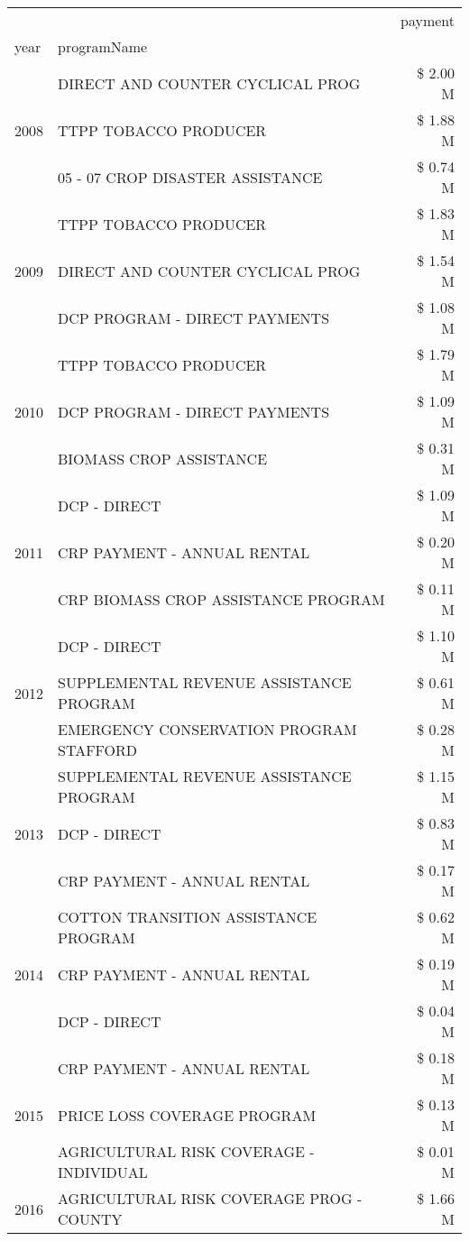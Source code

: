 \begin{tabular}{llr}
\toprule
 &  & payment \\
year & programName &  \\
\midrule
\multirow[t]{3}{*}{2008} & DIRECT AND COUNTER CYCLICAL PROG & \$ 2.00 M \\
 & TTPP TOBACCO PRODUCER & \$ 1.88 M \\
 & 05 - 07 CROP DISASTER ASSISTANCE & \$ 0.74 M \\
\cline{1-3}
\multirow[t]{3}{*}{2009} & TTPP TOBACCO PRODUCER & \$ 1.83 M \\
 & DIRECT AND COUNTER CYCLICAL PROG & \$ 1.54 M \\
 & DCP PROGRAM - DIRECT PAYMENTS & \$ 1.08 M \\
\cline{1-3}
\multirow[t]{3}{*}{2010} & TTPP TOBACCO PRODUCER & \$ 1.79 M \\
 & DCP PROGRAM - DIRECT PAYMENTS & \$ 1.09 M \\
 & BIOMASS CROP ASSISTANCE & \$ 0.31 M \\
\cline{1-3}
\multirow[t]{3}{*}{2011} & DCP - DIRECT & \$ 1.09 M \\
 & CRP PAYMENT - ANNUAL RENTAL & \$ 0.20 M \\
 & CRP BIOMASS CROP ASSISTANCE PROGRAM & \$ 0.11 M \\
\cline{1-3}
\multirow[t]{3}{*}{2012} & DCP - DIRECT & \$ 1.10 M \\
 & SUPPLEMENTAL REVENUE ASSISTANCE PROGRAM & \$ 0.61 M \\
 & EMERGENCY CONSERVATION PROGRAM STAFFORD & \$ 0.28 M \\
\cline{1-3}
\multirow[t]{3}{*}{2013} & SUPPLEMENTAL REVENUE ASSISTANCE PROGRAM & \$ 1.15 M \\
 & DCP - DIRECT & \$ 0.83 M \\
 & CRP PAYMENT - ANNUAL RENTAL & \$ 0.17 M \\
\cline{1-3}
\multirow[t]{3}{*}{2014} & COTTON TRANSITION ASSISTANCE PROGRAM & \$ 0.62 M \\
 & CRP PAYMENT - ANNUAL RENTAL & \$ 0.19 M \\
 & DCP - DIRECT & \$ 0.04 M \\
\cline{1-3}
\multirow[t]{3}{*}{2015} & CRP PAYMENT - ANNUAL RENTAL & \$ 0.18 M \\
 & PRICE LOSS COVERAGE PROGRAM & \$ 0.13 M \\
 & AGRICULTURAL RISK COVERAGE - INDIVIDUAL & \$ 0.01 M \\
\cline{1-3}
\multirow[t]{3}{*}{2016} & AGRICULTURAL RISK COVERAGE PROG - COUNTY & \$ 1.66 M \\

\end{tabular}
